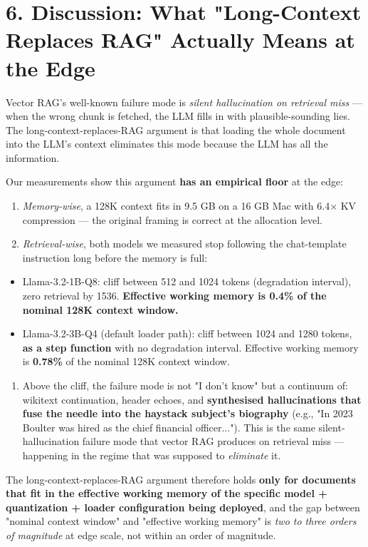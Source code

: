 \documentclass[11pt]{article}
\begin{document}
\section*{6. Discussion: What "Long-Context Replaces RAG" Actually Means at the Edge}


Vector RAG's well-known failure mode is \textit{silent hallucination on retrieval miss} — when the wrong chunk is fetched, the LLM fills in with plausible-sounding lies. The long-context-replaces-RAG argument is that loading the whole document into the LLM's context eliminates this mode because the LLM has all the information.


Our measurements show this argument \textbf{has an empirical floor} at the edge:


\begin{enumerate}
\item \textit{Memory-wise}, a 128K context fits in 9.5 GB on a 16 GB Mac with 6.4× KV compression — the original framing is correct at the allocation level.
\item \textit{Retrieval-wise}, both models we measured stop following the chat-template instruction long before the memory is full:
\end{enumerate}

\begin{itemize}
\item Llama-3.2-1B-Q8: cliff between 512 and 1024 tokens (degradation interval), zero retrieval by 1536. \textbf{Effective working memory is 0.4\% of the nominal 128K context window.}
\item Llama-3.2-3B-Q4 (default loader path): cliff between 1024 and 1280 tokens, \textbf{as a step function} with no degradation interval. Effective working memory is \textbf{0.78\%} of the nominal 128K context window.
\end{itemize}


\begin{enumerate}
\item Above the cliff, the failure mode is not "I don't know" but a continuum of: wikitext continuation, header echoes, and \textbf{synthesised hallucinations that fuse the needle into the haystack subject's biography} (e.g., "In 2023 Boulter was hired as the chief financial officer..."). This is the same silent-hallucination failure mode that vector RAG produces on retrieval miss — happening in the regime that was supposed to \textit{eliminate} it.
\end{enumerate}


The long-context-replaces-RAG argument therefore holds \textbf{only for documents that fit in the effective working memory of the specific model + quantization + loader configuration being deployed}, and the gap between "nominal context window" and "effective working memory" is \textit{two to three orders of magnitude} at edge scale, not within an order of magnitude.
\end{document}
